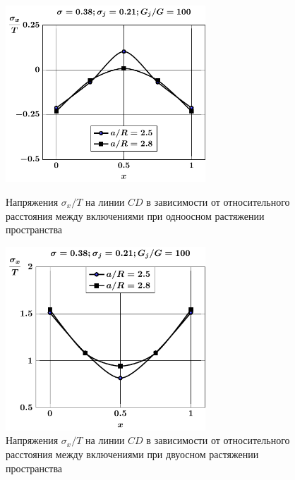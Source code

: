 \begin{russian}
\begin{figure}[h!]
\centering\footnotesize
\parbox[b]{7.5cm}{\centering\includegraphics[width=7.5cm]{inc13-a-d95-g100-t1-sig_x-cd.pdf}
\caption{Напряжения $\sigma_x/T$ на линии  $CD$ в зависимости от относительного расстояния между включениями при одноосном растяжении пространства
\label{f:8:78}}}\hfil\hfil
\parbox[b]{7.5cm}{\centering\includegraphics[width=7.5cm]{inc13-a-d95-g100-t2-sig_x-cd.pdf}
\caption{Напряжения $\sigma_x/T$ на линии  $CD$ в зависимости от относительного расстояния между включениями при двуосном растяжении пространства
\label{f:8:79}}}
\end{figure}


\end{russian}
